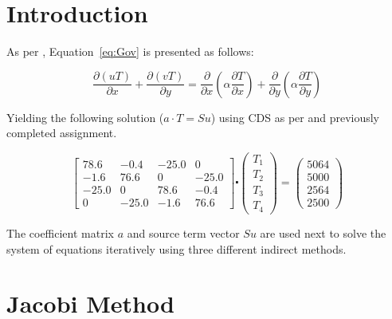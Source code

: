 
\chapter{Introduction}
\label{chap:intro}

As per \cite{assign}, Equation~\ref{eq:Gov} is presented as follows:

\begin{equation}
	\label{eq:Gov}	
	\frac{\partial(uT)}{\partial x} + \frac{\partial(vT)}{\partial y}= \frac{\partial}{\partial x} \left( \alpha \frac{\partial T}{\partial x} \right) + \frac{\partial}{\partial y} \left( \alpha \frac{\partial T}{\partial y} \right)
\end{equation}

Yielding the following solution ($a \cdot T = Su$) using CDS as per \cite{assign} and previously completed assignment.

\begin{equation*}
	\begin{bmatrix}
		78.6	&	-0.4	&	-25.0 	&	0		\\
		-1.6	&	76.6 	&	0  		&	-25.0	\\
		-25.0	&	0   	&	78.6	&	-0.4	\\
		0  		&	-25.0	&	-1.6	&	76.6
	\end{bmatrix}
	\centerdot 
	\begin{pmatrix} T_1	\\	T_2	\\	T_3	\\ T_4	\end{pmatrix}
	=
	\begin{pmatrix} 5064	\\	5000	\\	2564	\\ 2500 \end{pmatrix}	
\end{equation*}

The coefficient matrix $a$ and source term vector $Su$ are used next to solve the system of equations iteratively using three different indirect methods. \\

\chapter{Jacobi Method}
\label{chap:jacobi}

